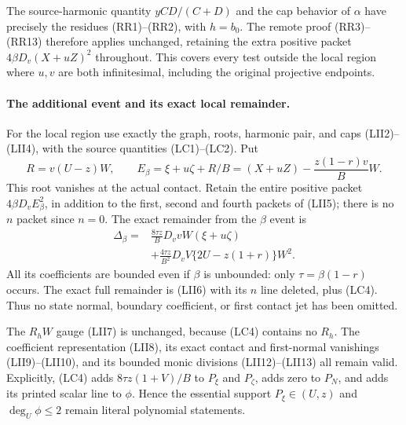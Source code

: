 The source-harmonic quantity $yCD/(C+D)$ and the cap behavior of
$\alpha$ have precisely the residues (RR1)--(RR2), with
$h=b_0$.  The remote proof (RR3)--(RR13) therefore applies unchanged,
retaining the extra positive packet
$4\beta D_v(X+uZ)^2$ throughout.  This covers every test outside
the local region where $u,v$ are both infinitesimal, including the
original projective endpoints.

\paragraph{The additional event and its exact local remainder.}
For the local region use exactly the graph, roots, harmonic pair,
and caps (LII2)--(LII4), with the source quantities (LC1)--(LC2).
Put
\[
 R=v(U-z)W,\qquad
 E_\beta=\xi+u\zeta+R/B
          =(X+uZ)-\frac{z(1-r)v}{B}W.                    \tag{LC3}
\]
This root vanishes at the actual contact.  Retain the entire
positive packet $4\beta D_vE_\beta^2$, in addition to the first,
second and fourth packets of (LII5); there is no $n$ packet since
$n=0$.  The exact remainder from the $\beta$ event is
\[
 \begin{split}
 \Delta_\beta={}&
 \frac{8\tau z}{B}D_vvW(\xi+u\zeta)\\
 &+\frac{4\tau z}{B^2}D_vV\{2U-z(1+r)\}W^2.
 \end{split}                                             \tag{LC4}
\]
All its coefficients are bounded even if $\beta$ is unbounded:
only $\tau=\beta(1-r)$ occurs.  The exact full remainder is (LII6)
with its $n$ line deleted, plus (LC4).  Thus no state normal,
boundary coefficient, or first contact jet has been omitted.

The $R_hW$ gauge (LII7) is unchanged, because (LC4) contains no
$R_h$.  The coefficient representation (LII8), its exact contact
and first-normal vanishings (LII9)--(LII10), and its bounded monic
divisions (LII12)--(LII13) all remain valid.  Explicitly, (LC4)
adds $8\tau z(1+V)/B$ to $P_\xi$ and $P_\zeta$, adds zero to
$P_N$, and adds its printed scalar line to $\phi$.  Hence the
essential support $P_\xi\in(U,z)$ and $\deg_U\phi\le2$ remain
literal polynomial statements.

